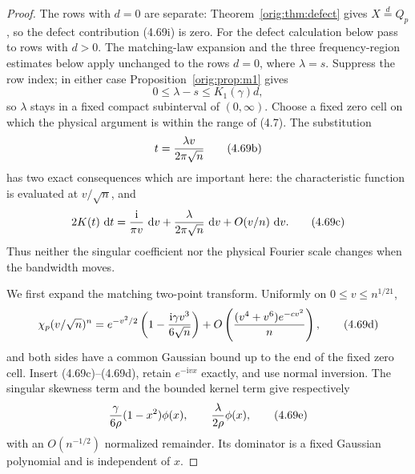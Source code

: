 \documentclass[11pt,a4paper]{article}
\numberwithin{equation}{section}
\theoremstyle{definition}
\theoremstyle{remark}
\newcommand{\ii}{\mathrm i}
\newcommand{\dd}{\,\mathrm d}
\begin{document}
\begin{proof}
The rows with $d=0$ are separate: Theorem~\ref{orig:thm:defect} gives
$X\stackrel d=Q_p$, so the defect contribution (4.69i) is zero.  For the defect
calculation below pass to rows with $d>0$.  The matching-law expansion and
the three frequency-region estimates below apply unchanged to the rows
$d=0$, where $\lambda=s$.  Suppress the row index; in either case
Proposition~\ref{orig:prop:m1} gives
\[
 0\le\lambda-s\le K_1(\gamma)d,                       \tag{4.69a}
\]
so $\lambda$ stays in a fixed compact subinterval of $(0,\infty)$.
Choose a fixed zero cell on which the physical argument is within the
range of (4.7).  The substitution
\[
 t={\lambda v\over2\pi\sqrt n}                        \tag{4.69b}
\]
has two exact consequences which are important here: the characteristic
function is evaluated at $v/\sqrt n$, and
\[
 2K(t)\,\dd t={\ii\over\pi v}\,\dd v
       +{\lambda\over2\pi\sqrt n}\,\dd v
       +O(v/n)\,\dd v.                                \tag{4.69c}
\]
Thus neither the singular coefficient nor the physical Fourier scale
changes when the bandwidth moves.

We first expand the matching two-point transform.  Uniformly on
$0\le v\le n^{1/21}$,
\[
 \chi_p(v/\sqrt n)^n=e^{-v^2/2}
 \left(1-{\ii\gamma v^3\over6\sqrt n}\right)
 +O\left({(v^4+v^6)e^{-cv^2}\over n}\right),          \tag{4.69d}
\]
and both sides have a common Gaussian bound up to the end of the fixed
zero cell.  Insert (4.69c)--(4.69d), retain
$e^{-\ii vx}$ exactly, and use normal inversion.  The singular skewness
term and the bounded kernel term give respectively
\[
 {\gamma\over6\rho}(1-x^2)\phi(x),\qquad
 {\lambda\over2\rho}\phi(x),                         \tag{4.69e}
\]
with an $O(n^{-1/2})$ normalized remainder.  Its dominator is a fixed
Gaussian polynomial and is independent of $x$.


\end{proof}
\end{document}
